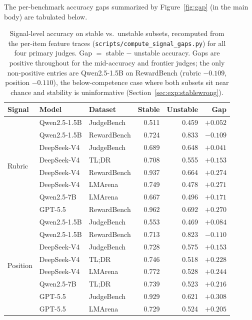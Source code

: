 The per-benchmark accuracy gaps summarized by Figure~\ref{fig:gap} (in the main body) are tabulated below.

\begin{table}[t]
\centering
\small
\setlength{\tabcolsep}{4pt}
\caption{Signal-level accuracy on stable vs.\ unstable subsets, recomputed from the per-item feature traces (\texttt{scripts/compute\_signal\_gaps.py}) for all four primary judges. Gap $=$ stable $-$ unstable accuracy. Gaps are positive throughout for the mid-accuracy and frontier judges; the only non-positive entries are Qwen2.5-1.5B on RewardBench (rubric $-0.109$, position $-0.110$), the below-competence case where both subsets sit near chance and stability is uninformative (Section~\ref{sec:exp:stablewrong}).}
\label{tab:signals}
\begin{tabular}{lllrrr}
\toprule
Signal & Model & Dataset & Stable & Unstable & Gap \\
\midrule
\multirow{8}{*}{Rubric}
 & Qwen2.5-1.5B & JudgeBench & 0.511 & 0.459 & $+0.052$ \\
 & Qwen2.5-1.5B & RewardBench & 0.724 & 0.833 & $-0.109$ \\
 & DeepSeek-V4 & JudgeBench & 0.689 & 0.648 & $+0.041$ \\
 & DeepSeek-V4 & TL;DR & 0.708 & 0.555 & $+0.153$ \\
 & DeepSeek-V4 & RewardBench & 0.937 & 0.664 & $+0.274$ \\
 & DeepSeek-V4 & LMArena & 0.749 & 0.478 & $+0.271$ \\
 & Qwen2.5-7B & LMArena & 0.667 & 0.496 & $+0.171$ \\
 & GPT-5.5 & RewardBench & 0.962 & 0.692 & $+0.270$ \\
\midrule
\multirow{8}{*}{Position}
 & Qwen2.5-1.5B & JudgeBench & 0.553 & 0.469 & $+0.084$ \\
 & Qwen2.5-1.5B & RewardBench & 0.713 & 0.823 & $-0.110$ \\
 & DeepSeek-V4 & JudgeBench & 0.728 & 0.575 & $+0.153$ \\
 & DeepSeek-V4 & TL;DR & 0.746 & 0.518 & $+0.228$ \\
 & DeepSeek-V4 & LMArena & 0.772 & 0.528 & $+0.244$ \\
 & Qwen2.5-7B & TL;DR & 0.739 & 0.523 & $+0.216$ \\
 & GPT-5.5 & JudgeBench & 0.929 & 0.621 & $+0.308$ \\
 & GPT-5.5 & LMArena & 0.729 & 0.524 & $+0.205$ \\
\bottomrule
\end{tabular}
\end{table}

